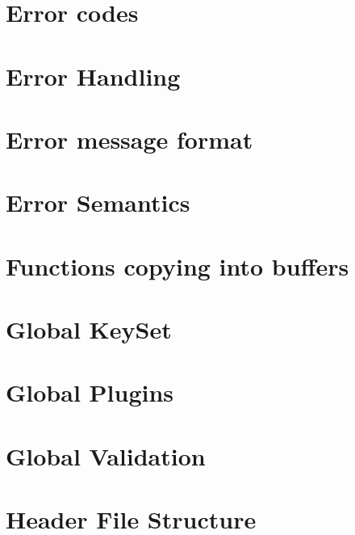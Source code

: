 \let\mypdfximage\pdfximage\def\pdfximage{\immediate\mypdfximage}\documentclass[twoside]{book}
\newcommand{\+}{\discretionary{\mbox{\scriptsize$\hookleftarrow$}}{}{}}
\begin{document}
\chapter{Error codes}
\label{doc_decisions_error_codes_md}

\chapter{Error Handling}
\label{doc_decisions_error_handling_md}

\chapter{Error message format}
\label{doc_decisions_error_message_format_md}

\chapter{Error Semantics}
\label{doc_decisions_error_semantics_md}

\chapter{Functions copying into buffers}
\label{doc_decisions_functions_with_buffers_md}

\chapter{Global Key\+Set}
\label{doc_decisions_global_keyset_md}

\chapter{Global Plugins}
\label{doc_decisions_global_plugins_md}

\chapter{Global Validation}
\label{doc_decisions_global_validation_md}

\chapter{Header File Structure}
\label{doc_decisions_header_file_structure_md}

\end{document}
